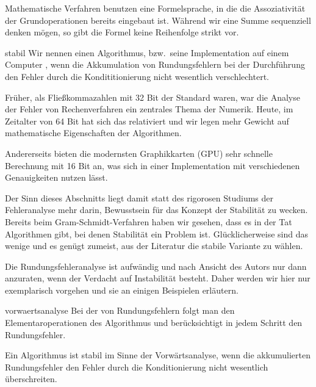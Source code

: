 \begin{remark}
  Mathematische Verfahren benutzen eine Formelsprache, in die die
  Assoziativität der Grundoperationen bereits eingebaut ist. Während
  wir eine Summe sequenziell denken mögen, so gibt die Formel keine
  Reihenfolge strikt vor.
\end{remark}

\begin{Definition}{stabil}
  Wir nennen einen Algorithmus, bzw.\ seine Implementation auf einem
  Computer , wenn die Akkumulation von Rundungsfehlern
  bei der Durchführung den Fehler durch die Kondititionierung nicht
  wesentlich verschlechtert.
\end{Definition}

\begin{remark}
  Früher, als Fließkommazahlen mit 32 Bit der Standard waren, war die
  Analyse der Fehler von Rechenverfahren ein zentrales Thema der
  Numerik. Heute, im Zeitalter von 64 Bit hat sich das relativiert und
  wir legen mehr Gewicht auf mathematische Eigenschaften der Algorithmen.

  Andererseits bieten die modernsten Graphikkarten (GPU) sehr schnelle
  Berechnung mit 16 Bit an, was sich in einer Implementation mit
  verschiedenen Genauigkeiten nutzen lässt.

  Der Sinn dieses Abschnitts liegt damit statt des rigorosen Studiums
  der Fehleranalyse mehr darin, Bewusstsein für das Konzept der
  Stabilität zu wecken. Bereits beim Gram-Schmidt-Verfahren haben wir
  gesehen, dass es in der Tat Algorithmen gibt, bei denen Stabilität
  ein Problem ist. Glücklicherweise sind das wenige und es genügt
  zumeist, aus der Literatur die stabile Variante zu wählen.

  Die Rundungsfehleranalyse ist aufwändig und nach Ansicht des Autors
  nur dann anzuraten, wenn der Verdacht auf Instabilität
  besteht. Daher werden wir hier nur exemplarisch vorgehen und sie an
  einigen Beispielen erläutern.
\end{remark}

\begin{Definition}{vorwaertsanalyse}
  Bei der  von Rundungsfehlern folgt man den
  Elementaroperationen des Algorithmus und berücksichtigt in jedem
  Schritt den Rundungsfehler.

  Ein Algorithmus ist stabil im Sinne der Vorwärtsanalyse, wenn die
  akkumulierten Rundungsfehler den Fehler durch die Konditionierung
  nicht wesentlich überschreiten.
\end{Definition}

